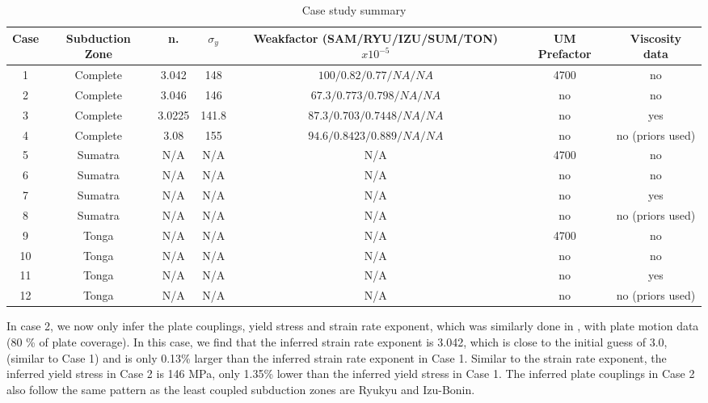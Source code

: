 \documentclass[12pt]{article}
\begin{document}
\begin{table}
\centering
	\begin{table}[H]
		\caption{Case study summary} %
		\centering  %
		\begin{tabular}{c c c c c c c  } %
		\hline \hline                        %
		Case & Subduction Zone &n. &$\sigma_y$&Weakfactor (SAM/RYU/IZU/SUM/TON) $x10^{-5}$ &UM Prefactor &Viscosity data   \\ [0.5ex] %
		\hline                  %
	        1 &Complete& 3.042 & 148 & $100/0.82/0.77/NA/NA$ &  4700& no \\
	        2 &Complete& 3.046 & 146 & $67.3/0.773/0.798/NA/NA$ & no & no \\
	        3 &Complete& 3.0225 & 141.8 & $87.3/0.703/0.7448/NA/NA$ & no & yes \\
	        4 &Complete& 3.08 & 155 & $94.6/0.8423/0.889/NA/NA$ & no & no (priors used) \\
             5 &Sumatra& N/A & N/A & N/A &  4700& no \\
	        6 &Sumatra& N/A & N/A & N/A & no & no \\
	        7 &Sumatra& N/A & N/A & N/A & no & yes \\
	        8 &Sumatra& N/A & N/A & N/A & no & no (priors used) \\
             9 &Tonga& N/A & N/A & N/A &  4700& no \\
	        10 &Tonga& N/A & N/A & N/A & no & no \\
	        11 &Tonga& N/A & N/A & N/A & no & yes \\
	        12 &Tonga& N/A & N/A & N/A & no & no (priors used) \\
                
                \hline %
		\end{tabular}
		\label{table:inversions} %
		\end{table}
\end{table}

 In case 2, we now only infer the plate couplings, yield stress and strain rate exponent, which was similarly done in \citep{ratnaswamy2015adjoint}, with plate motion data (80 \% of plate coverage). In this case, we find that the inferred strain rate exponent is 3.042, which is close to the initial guess of 3.0, (similar to Case 1) and is only 0.13\% larger than the inferred strain rate exponent in Case 1. Similar to the strain rate exponent, the inferred yield stress in Case 2 is 146 MPa, only 1.35\% lower than the inferred yield stress in Case 1. The inferred plate couplings in Case 2 also follow the same pattern as the least coupled subduction zones are Ryukyu and Izu-Bonin. 
\end{document}
